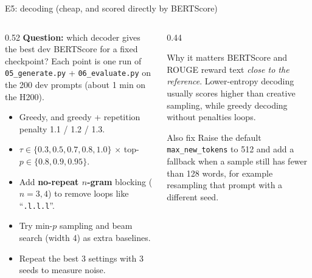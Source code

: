 \documentclass[aspectratio=169,11pt]{beamer}
\newcommand{\code}[1]{\texttt{\small #1}}
\begin{document}
\begin{frame}{E5: decoding (cheap, and scored directly by BERTScore)}
  \begin{columns}[T]
    \begin{column}{0.52\textwidth}
      \small
      \textbf{Question:} which decoder gives the best dev BERTScore for a fixed checkpoint?
      Each point is one run of \code{05\_generate.py} + \code{06\_evaluate.py} on the 200 dev prompts (about 1 min on the H200).

      \vspace{1mm}
      \begin{itemize}
        \item Greedy, and greedy + repetition penalty 1.1 / 1.2 / 1.3.
        \item $\tau \in \{0.3, 0.5, 0.7, 0.8, 1.0\}$ $\times$ top-$p \in \{0.8, 0.9, 0.95\}$.
        \item Add \textbf{no-repeat $n$-gram} blocking ($n{=}3,4$) to remove loops like ``\code{.l.l.l}''.
        \item Try min-$p$ sampling and beam search (width 4) as extra baselines.
        \item Repeat the best 3 settings with 3 seeds to measure noise.
      \end{itemize}
    \end{column}
    \begin{column}{0.44\textwidth}
      \begin{block}{Why it matters}
        \small BERTScore and ROUGE reward text \emph{close to the reference}. Lower-entropy decoding usually scores higher than creative sampling, while greedy decoding without penalties loops.
      \end{block}
      \begin{exampleblock}{Also fix}
        \small Raise the default \code{max\_new\_tokens} to 512 and add a fallback when a sample still has fewer than 128 words, for example resampling that prompt with a different seed.
      \end{exampleblock}
    \end{column}
  \end{columns}
\end{frame}
\end{document}
